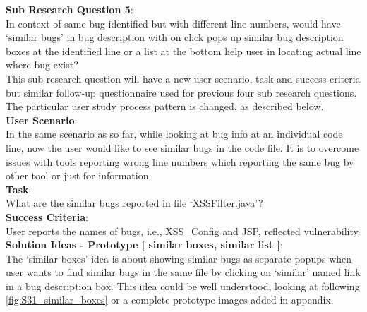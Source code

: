 \clearpage
\textbf{Sub Research Question 5}: \\

In context of same bug identified but with different line numbers, would have ‘similar bugs’ in bug description with on click pops up similar bug description boxes at the identified line or a list at the bottom help user in locating actual line where bug exist? \\


This sub research question will have a new user scenario, task and success criteria but similar follow-up questionnaire used for previous four sub research questions. The particular user study process pattern is changed, as described below. \\

\textbf{User Scenario}: \\

In the same scenario as so far, while looking at bug info at an individual code line, now the user would like to see similar bugs in the code file. It is to overcome issues with tools reporting wrong line numbers which reporting the same bug by other tool or just for information. \\



\textbf{Task}: \\

What are the similar bugs reported in file ‘XSSFilter.java’? \\

\textbf{Success Criteria}: \\

User reports the names of bugs, i.e., XSS\_Config and JSP, reflected vulnerability. \\


\textbf{Solution Ideas - Prototype [ similar boxes, similar list ]}: \\

The ‘similar boxes’ idea is about showing similar bugs as separate popups when user wants to find similar bugs in the same file by clicking on ‘similar’ named link in a bug description box. This idea could be well understood, looking at following \autoref{fig:S31_similar_boxes} or a complete prototype images added in appendix. \\

